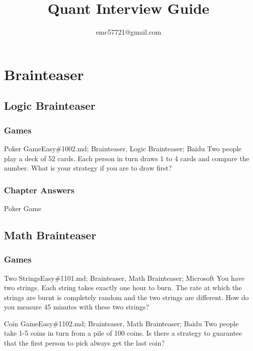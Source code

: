 \documentclass[oldfontcommands]{memoir}
\title{Quant Interview Guide}
\author{emc57721@gmail.com}
\begin{document}
{
\maketitle

\setcounter{tocdepth}{3}
\tableofcontents

\adjustmtc\part{Brainteaser}
\chapter{Logic Brainteaser}
\minitoc
\section{Games}
\begin{question}{Poker Game}{Easy}{\#1002.md; Brainteaser, Logic Brainteaser; Baidu}
Two people play a deck of 52 cards. Each person in turn draws 1 to 4 cards and compare the number. What is your strategy if you are to draw first?

\end{question}

\newpage\section{Chapter Answers}\begin{answer}{Poker Game}
\end{answer}
\chapter{Math Brainteaser}
\minitoc
\section{Games}
\begin{question}{Two Strings}{Easy}{\#1101.md; Brainteaser, Math Brainteaser; Microsoft}
You have two strings. Each string takes exactly one hour to burn. The rate at which the strings are burnt is completely random and the two strings are different. How do you measure 45 minutes with these two strings?

\end{question}

\begin{question}{Coin Game}{Easy}{\#1102.md; Brainteaser, Math Brainteaser; Baidu}
Two people take 1-5 coins in turn from a pile of 100 coins. Is there a strategy to guarantee that the first person to pick always get the last coin?


\end{question}}
\end{document}
